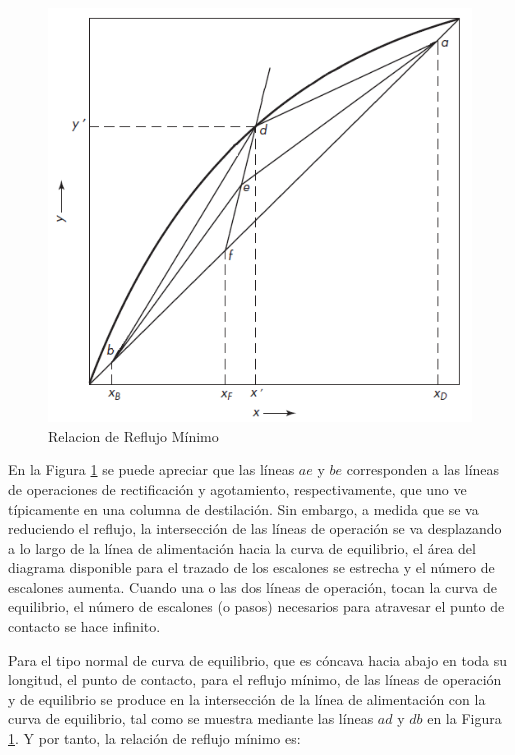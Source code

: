 \documentclass[11pt]{book}
\begin{document}
\begin{figure}[H]
    \centering
    \includegraphics{img/destilacion/ReflujoMinimoDestilacion.png}
    \caption{Relacion de Reflujo Mínimo}
    \label{fig:ReflujoMinimo_Destilacion}
\end{figure}

En la Figura \ref{fig:ReflujoMinimo_Destilacion} se puede apreciar que las líneas $ae$ y $be$ corresponden a las líneas de operaciones de rectificación y agotamiento, respectivamente, que uno ve típicamente en una columna de destilación. Sin embargo, a medida que se va reduciendo el reflujo,
la intersección de las líneas de operación se va desplazando a lo largo de la línea de alimentación hacia la curva de equilibrio, el área del diagrama disponible para el trazado de los escalones se estrecha y el número de escalones aumenta. Cuando una o las dos líneas de operación, tocan la curva de equilibrio, el número de escalones (o pasos) necesarios para atravesar el punto de contacto se hace infinito. 

Para el tipo normal de curva de equilibrio, que es cóncava hacia abajo en toda su longitud, el punto de contacto, para el reflujo mínimo, de las líneas de operación y de equilibrio se produce en la intersección de la línea de alimentación con la curva de equilibrio, tal como se muestra mediante las líneas $ad$ y $db$ en la Figura \ref{fig:ReflujoMinimo_Destilacion}. Y por tanto, la relación de reflujo mínimo es:
\end{document}
